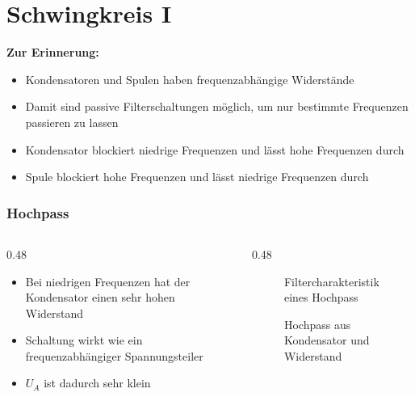 
\section{Schwingkreis I}
\label{section:schwingkreis_1}
\begin{frame}%
    \textbf{Zur Erinnerung:}
    \begin{itemize}[<+->]
        \item Kondensatoren und Spulen haben frequenzabhängige Widerstände
        \item Damit sind passive Filterschaltungen möglich, um nur bestimmte Frequenzen passieren zu lassen
        \item Kondensator blockiert niedrige Frequenzen und lässt hohe Frequenzen durch
        \item Spule blockiert hohe Frequenzen und lässt niedrige Frequenzen durch
    \end{itemize}
\end{frame}

\begin{frame}
\frametitle{Hochpass}
\begin{columns}
    \begin{column}{0.48\textwidth}
    \begin{itemize}
  \item Bei niedrigen Frequenzen hat der Kondensator einen sehr hohen Widerstand
  \item Schaltung wirkt wie ein frequenzabhängiger Spannungsteiler
  \item $U_A$ ist dadurch sehr klein
  \end{itemize}

    \end{column}
   \begin{column}{0.48\textwidth}
       
\begin{figure}
    \caption{\scriptsize Filtercharakteristik eines Hochpass}
    \label{e_hochpass}
\end{figure}


\begin{figure}
    \caption{\scriptsize Hochpass aus Kondensator und Widerstand}
    \label{e_hochpass_rc}
\end{figure}


   \end{column}
\end{columns}

\end{frame}

